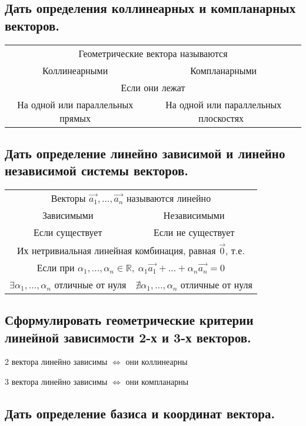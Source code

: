 \documentclass[a4paper, 10pt]{article}
\newcommand{\mcol}[1]{\multicolumn{2}{c}{#1}}
\newcommand{\nul}{\vec{0}}
\begin{document}
\subsection{Дать определения коллинеарных и компланарных векторов.}

\begin{center}
\begin{tabular}{c c} 
    \mcol{Геометрические вектора называются}\\
    Коллинеарными & Компланарными\\
    \mcol{Если они лежат }\\
    На одной или параллельных прямых & На одной или параллельных плоскостях \\
\end{tabular}
\end{center}

\subsection{Дать определение линейно зависимой и линейно независимой системы векторов.}

\begin{center}
\begin{tabular}{c c} 
    \mcol{Векторы $\vec{a_1},...,\vec{a_n}$ называются линейно}\\
    Зависимыми & Независимыми\\
    Если существует & Если не существует\\
    \mcol{Их нетривиальная линейная комбинация, равная $\nul$, т.е.}\\
    \mcol{Если при $\alpha_1,...,\alpha_n \in \mathbb{R}, \ \alpha_1 \vec{a_1} +...+ \alpha_n \vec{a_n} = 0$ }\\
    $\exists \alpha_1,...,\alpha_n$ отличные от нуля & $\nexists \alpha_1,...,\alpha_n$ отличные от нуля \\
\end{tabular}
\end{center}

\subsection{Сформулировать геометрические критерии линейной зависимости 2-х и 3-х векторов.}

2 вектора линейно зависимы $\iff$ они коллинеарны

3 вектора линейно зависимы $\iff$ они компланарны

\subsection{Дать определение базиса и координат вектора.}
\end{document}
